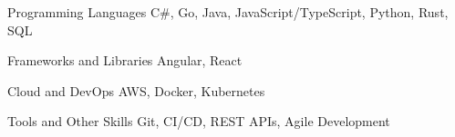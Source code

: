 
\begin{cvskills}

  \cvskill
    {Programming Languages}
    {C\#, Go, Java, JavaScript/TypeScript, Python, Rust, SQL}

  \cvskill
    {Frameworks and Libraries}
    {Angular, React}

  \cvskill
    {Cloud and DevOps}
    {AWS, Docker, Kubernetes}

  \cvskill
    {Tools and Other Skills}
    {Git, CI/CD, REST APIs, Agile Development}

\end{cvskills}
